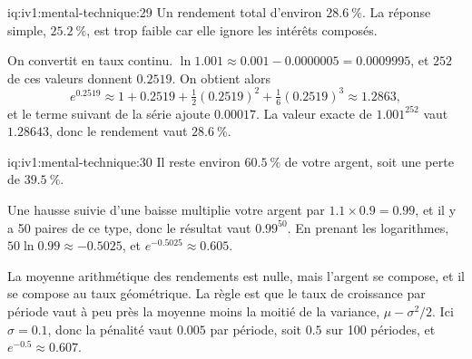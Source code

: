 \begin{solution}{iq:iv1:mental-technique:29}
Un rendement total d'environ $28.6~\%$. La réponse simple, $25.2~\%$, est trop faible car elle ignore les intérêts composés.

On convertit en taux continu. $\ln 1.001 \approx 0.001 - 0.0000005 = 0.0009995$, et $252$ de ces valeurs donnent $0.2519$. On obtient alors
\[
e^{0.2519} \approx 1 + 0.2519 + \tfrac12 (0.2519)^2 + \tfrac16 (0.2519)^3 \approx 1.2863,
\]
et le terme suivant de la série ajoute $0.00017$. La valeur exacte de $1.001^{252}$ vaut $1.28643$, donc le rendement vaut $28.6~\%$.

\end{solution}

\begin{solution}{iq:iv1:mental-technique:30}
Il reste environ $60.5~\%$ de votre argent, soit une perte de $39.5~\%$.

Une hausse suivie d'une baisse multiplie votre argent par $1.1 \times 0.9 = 0.99$, et il y a 50 paires de ce type, donc le résultat vaut $0.99^{50}$. En prenant les logarithmes, $50 \ln 0.99 \approx -0.5025$, et $e^{-0.5025} \approx 0.605$.

La moyenne arithmétique des rendements est nulle, mais l'argent se compose, et il se compose au taux géométrique. La règle est que le taux de croissance par période vaut à peu près la moyenne moins la moitié de la variance, $\mu - \sigma^2/2$. Ici $\sigma = 0.1$, donc la pénalité vaut $0.005$ par période, soit $0.5$ sur 100 périodes, et $e^{-0.5} \approx 0.607$.

\end{solution}


